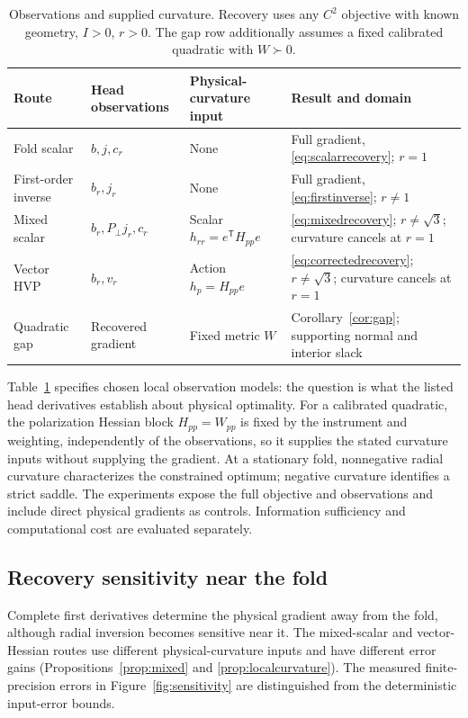 \documentclass[10pt,a4paper]{article}
\begin{document}
\begin{table}[!t]
\caption{Observations and supplied curvature. Recovery uses any $C^2$ objective with known geometry, $I>0$, $r>0$. The gap row additionally assumes a fixed calibrated quadratic with $W\succ0$.}
\label{tab:contract}
\centering\small\renewcommand{\arraystretch}{1.13}
\begin{tabularx}{\textwidth}{@{}p{}p{}p{}X@{}}\toprule
Route & Head observations & Physical-curvature input & Result and domain\\\midrule
Fold scalar & $b,j,c_r$ & None & Full gradient, \eqref{eq:scalarrecovery}; $r=1$\\
First-order inverse & $b_r,j_r$ & None & Full gradient, \eqref{eq:firstinverse}; $r\ne1$\\
Mixed scalar & $b_r,P_\perp j_r,c_r$ & Scalar $h_{rr}=e^{\mathsf T}H_{pp}e$ & \eqref{eq:mixedrecovery}; $r\ne\sqrt3$; curvature cancels at $r=1$\\
Vector HVP & $b_r,v_r$ & Action $h_p=H_{pp}e$ & \eqref{eq:correctedrecovery}; $r\ne\sqrt3$; curvature cancels at $r=1$\\
Quadratic gap & Recovered gradient & Fixed metric $W$ & Corollary~\ref{cor:gap}; supporting normal and interior slack\\\bottomrule
\end{tabularx}
\end{table}

Table~\ref{tab:contract} specifies chosen local observation models: the question is what the listed head derivatives establish about physical optimality. For a calibrated quadratic, the polarization Hessian block $H_{pp}=W_{pp}$ is fixed by the instrument and weighting, independently of the observations, so it supplies the stated curvature inputs without supplying the gradient. At a stationary fold, nonnegative radial curvature characterizes the constrained optimum; negative curvature identifies a strict saddle. The experiments expose the full objective and observations and include direct physical gradients as controls. Information sufficiency and computational cost are evaluated separately.

\subsection{Recovery sensitivity near the fold}
Complete first derivatives determine the physical gradient away from the fold, although radial inversion becomes sensitive near it. The mixed-scalar and vector-Hessian routes use different physical-curvature inputs and have different error gains (Propositions~\ref{prop:mixed} and \ref{prop:localcurvature}). The measured finite-precision errors in Figure~\ref{fig:sensitivity} are distinguished from the deterministic input-error bounds.
\end{document}
